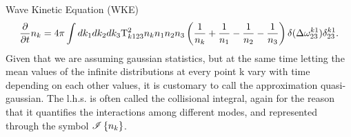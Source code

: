 Wave Kinetic Equation (WKE)
\begin{equation}
    \frac{\partial}{\partial t} n_k = 4 \pi\int dk_1 dk_2 dk_3 \\
    \mathrm{T}^2_{k123}n_kn_1n_2n_3
    \left(\frac{1}{n_k} + \frac{1}{n_1} - \frac{1}{n_2}- \frac{1}{n_3}  \right)
    \delta(\Delta{\omega}^{k1}_{23})\delta^{k1}_{23}.
    \label{kinetic}
\end{equation}
Given that we are assuming gaussian statistics, but at the same time letting the mean values of the infinite distributions at every point k 
vary with time depending on each other values, it is customary to call the approximation quasi-gaussian. The l.h.s. is often called the collisional integral, again 
for the reason that it quantifies the interactions among different modes, and represented through the symbol $\mathscr{I}\left\{n_k\right\}$.

